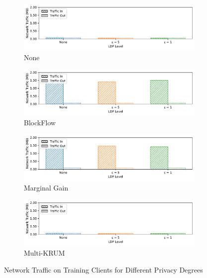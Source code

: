\begin{figure}[!ht]
    \centering
    \begin{subfigure}[b]{0.49\textwidth}
        \centering
        \includegraphics[width=\textwidth]{graphics/05_priv_net_none_client.pdf}
        \caption{None}
    \end{subfigure}
    \hfill
    \begin{subfigure}[b]{0.49\textwidth}
        \centering
        \includegraphics[width=\textwidth]{graphics/05_priv_net_blockflow_client.pdf}
        \caption{BlockFlow}
    \end{subfigure}
    \hfill
    \begin{subfigure}[b]{0.49\textwidth}
        \centering
        \includegraphics[width=\textwidth]{graphics/05_priv_net_marginalgain_client.pdf}
        \caption{Marginal Gain}
    \end{subfigure}
    \hfill
    \begin{subfigure}[b]{0.49\textwidth}
        \centering
        \includegraphics[width=\textwidth]{graphics/05_priv_net_multikrum_client.pdf}
        \caption{Multi-KRUM}
    \end{subfigure}
    \caption{Network Traffic on Training Clients for Different Privacy Degrees}
    \label{fig:net_priv_degree_clients}
\end{figure}

